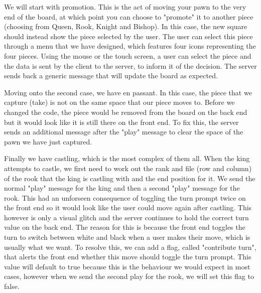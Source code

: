 We will start with promotion. This is the act of moving your pawn to the very end of the board, at which point you can choose to "promote" it to another piece (choosing from Queen, Rook, Knight and Bishop). In this case, the new square should instead show the piece selected by the user. The user can select this piece through a menu that we have designed, which features four icons representing the four pieces. Using the mouse or the touch screen, a user can select the piece and the data is sent by the client to the server, to inform it of the decision. The server sends back a generic message that will update the board as expected.

Moving onto the second case, we have en passant. In this case, the piece that we capture (take) is not on the same space that our piece moves to. Before we changed the code, the piece would be removed from the board on the back end but it would look like it is still there on the front end. To fix this, the server sends an additional message after the "play" message to clear the space of the pawn we have just captured.

Finally we have castling, which is the most complex of them all. When the king attempts to castle, we first need to work out the rank and file (row and column) of the rook that the king is castling with and the end position for it. We send the normal "play" message for the king and then a second "play" message for the rook. This had an unforseen consequence of toggling the turn prompt twice on the front end so it would look like the user could move again after castling. This however is only a visual glitch and the server continues to hold the correct turn value on the back end. The reason for this is because the front end toggles the turn to switch between white and black when a user makes their move, which is usually what we want. To resolve this, we can add a flag, called "contribute turn", that alerts the front end whether this move should toggle the turn prompt. This value will default to true because this is the behaviour we would expect in most cases, however when we send the second play for the rook, we will set this flag to false.

